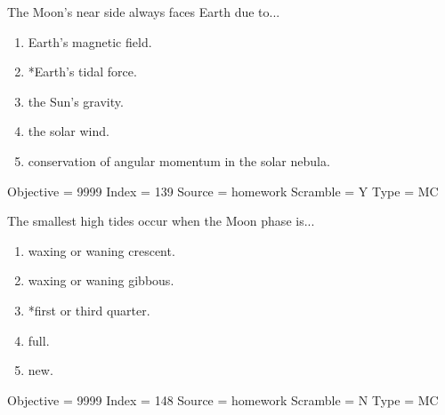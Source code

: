 \documentclass[11pt]{article}
\begin{document}
\begin{enumerate}
\begin{minipage}{\textwidth}
\begin{minipage}{\textwidth}
\item The Moon's near side always faces Earth due to...
\begin{enumerate} 
\setlength{\itemsep}{1pt} 
\setlength{\parskip}{0pt} 
\setlength{\parsep}{0pt}
\setlength{\multicolsep}{1pt} 
\item Earth's magnetic field.
\item *Earth's tidal force.
\item the Sun's gravity.
\item the solar wind.
\item conservation of angular momentum in the solar nebula.
\end{enumerate} 
Objective = 9999
Index = 139
Source = homework
Scramble = Y
Type = MC
\end{minipage}
\end{minipage}
\vskip 0.20in

\begin{minipage}{\textwidth}
\begin{minipage}{\textwidth}
\item The smallest high tides occur when the Moon phase is...
\begin{multicols}{2}
\begin{enumerate} 
\setlength{\itemsep}{1pt} 
\setlength{\parskip}{0pt} 
\setlength{\parsep}{0pt}
\setlength{\multicolsep}{1pt} 
\item waxing or waning crescent.
\item waxing or waning gibbous.
\item *first or third quarter.
\item full.
\item new.
\end{enumerate} 
\vfill 
\end{multicols}

Objective = 9999
Index = 148
Source = homework
Scramble = N
Type = MC
\end{minipage}
\end{minipage}
\vskip 0.20in


\end{enumerate}
\end{document}
